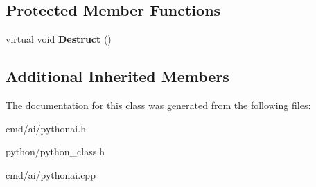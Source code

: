 \subsection*{Protected Member Functions}
\begin{DoxyCompactItemize}
\item 
virtual void {\bfseries Destruct} ()\hypertarget{classPythonAI_aabf4ebf41518ca4ab0da6103997fa87d}{}\label{classPythonAI_aabf4ebf41518ca4ab0da6103997fa87d}

\end{DoxyCompactItemize}
\subsection*{Additional Inherited Members}


The documentation for this class was generated from the following files\+:\begin{DoxyCompactItemize}
\item 
cmd/ai/pythonai.\+h\item 
python/python\+\_\+class.\+h\item 
cmd/ai/pythonai.\+cpp\end{DoxyCompactItemize}
